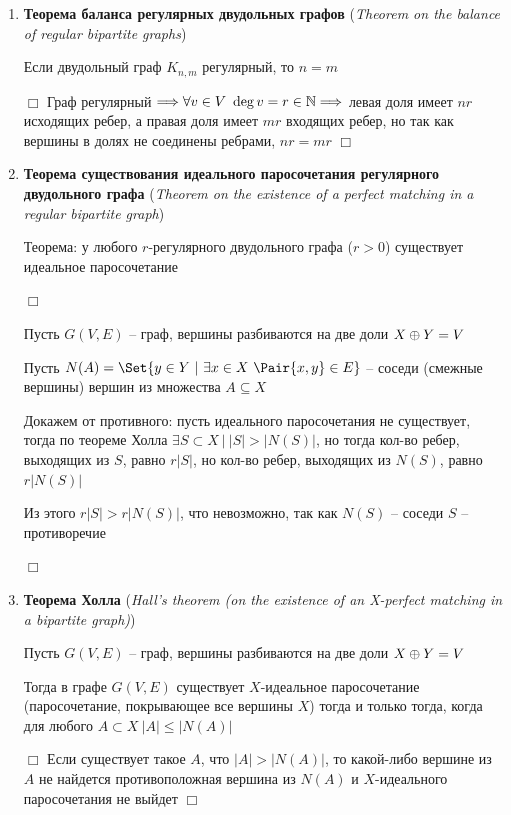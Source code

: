 \documentclass[12pt]{article}
\begin{document}
\begin{enumerate}
        \item \textbf{Теорема баланса регулярных двудольных графов} (\textit{Theorem on the balance of regular bipartite graphs})

        Если двудольный граф $K_{n,m}$ регулярный, то $n = m$

        $\Box$ Граф регулярный $\Longrightarrow \forall v \in V \ \deg v = r \in \mathbb{N} \Longrightarrow $ левая доля имеет $nr$ исходящих ребер, а правая доля имеет $mr$ входящих ребер, но так как вершины в долях не соединены ребрами, $nr = mr$ $\Box$

        \item \textbf{Теорема существования идеального паросочетания регулярного двудольного графа} (\textit{Theorem on the existence of a perfect matching in a regular bipartite graph})

        Теорема: у любого $r$-регулярного двудольного графа ($r > 0$) существует идеальное паросочетание

        $\Box$

        Пусть $G(V, E)$ -- граф, вершины разбиваются на две доли $X \oplus Y = V$

        Пусть $N(A) = \Set{y \in Y \ | \ \exists x \in X \ \Pair{x, y} \in E}$ -- соседи (смежные вершины) вершин из множества $A \subseteq X$

        Докажем от противного: пусть идеального паросочетания не существует, тогда по теореме Холла $\exists S \subset X \ | \ |S| > |N(S)|$,
        но тогда кол-во ребер, выходящих из $S$, равно $r|S|$, но кол-во ребер, выходящих из $N(S)$, равно $r|N(S)|$

        Из этого $r|S| > r|N(S)|$, что невозможно, так как $N(S)$ -- соседи $S$ -- противоречие

        $\Box$


        \item \textbf{Теорема Холла} (\textit{Hall's theorem (on the existence of an X-perfect matching in a bipartite graph)})

        Пусть $G(V, E)$ -- граф, вершины разбиваются на две доли $X \oplus Y = V$

        Тогда в графе $G(V, E)$ существует $X$-идеальное паросочетание (паросочетание, покрывающее все вершины $X$) тогда и только тогда,
        когда для любого $A \subset X \ |A| \leq |N(A)|$

        $\Box$ Если существует такое $A$, что $|A| > |N(A)|$, то какой-либо вершине из $A$ не найдется противоположная вершина из $N(A)$ и $X$-идеального паросочетания не выйдет $\Box$



\end{enumerate}
\end{document}
